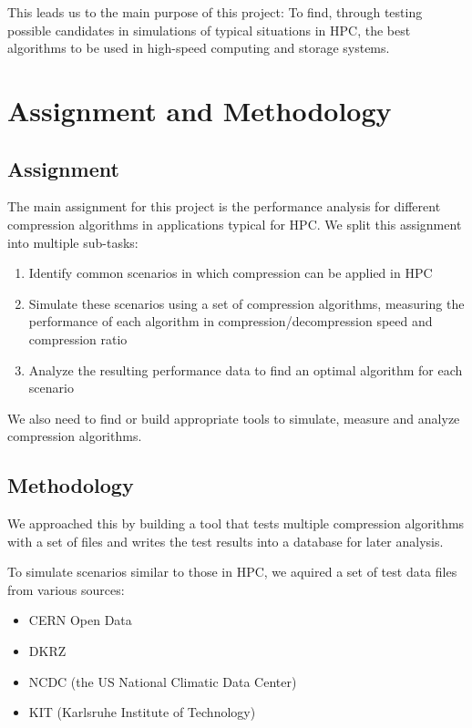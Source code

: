 \documentclass[
	12pt,
	a4paper,
	BCOR10mm,
	DIV14,
	listof=totoc,
	bibliography=totoc,
	headsepline
]{scrreprt}
\begin{document}
This leads us to the main purpose of this project: To find, through testing possible candidates in simulations of typical situations in HPC, the best algorithms to be used in high-speed computing and storage systems.


\chapter{Assignment and Methodology}
\label{Assignment and Methodology}
\section*{Assignment}
The main assignment for this project is the performance analysis for different compression algorithms in applications typical for HPC. We split this assignment into multiple sub-tasks:

\begin{enumerate}
\item Identify common scenarios in which compression can be applied in HPC
\item Simulate these scenarios using a set of compression algorithms, measuring the performance of each algorithm in compression/decompression speed and compression ratio
\item Analyze the resulting performance data to find an optimal algorithm for each scenario
\end{enumerate}

We also need to find or build appropriate tools to simulate, measure and analyze compression algorithms.


\section*{Methodology}
We approached this by building a tool that tests multiple compression algorithms with a set of files and writes the test results into a database for later analysis.

To simulate scenarios similar to those in HPC, we aquired a set of test data files from various sources:
\begin{itemize}
\item CERN Open Data
\item DKRZ
\item NCDC (the US National Climatic Data Center)
\item KIT (Karlsruhe Institute of Technology)
\end{itemize}
\end{document}

